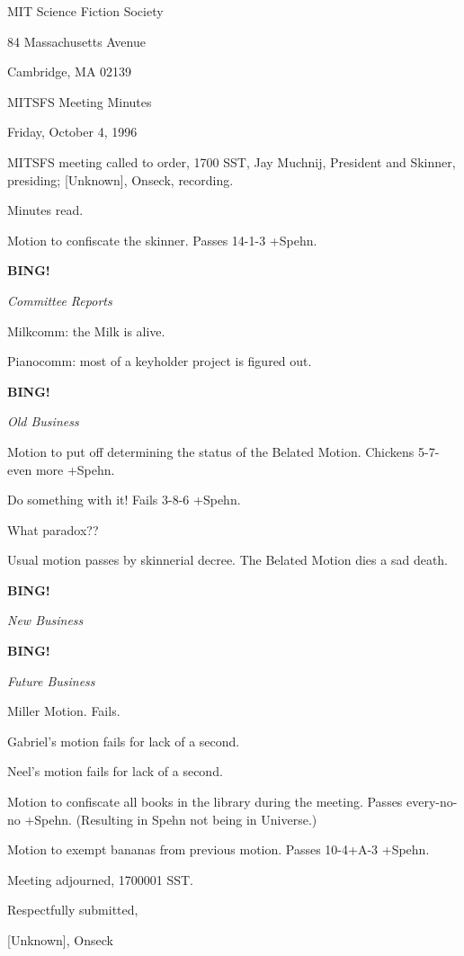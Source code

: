 \documentclass[12pt]{article}
\newcommand{\bing}{{\bf BING!} }
\newcommand{\goto}[1]{\bing \vskip 12pt \centerline{{\em{#1}}}}
\begin{document}
\begin{center}

MIT Science Fiction Society 

84 Massachusetts Avenue

Cambridge, MA 02139

\vspace{12pt}

MITSFS Meeting Minutes 

Friday, October 4, 1996

\end{center}
 
\vspace{18pt}

\setlength{\parskip}{6pt}

\noindent
MITSFS meeting called to order, 1700 SST,
Jay Muchnij, President and Skinner, presiding; [Unknown], Onseck, recording.

Minutes read.

Motion to confiscate the skinner. Passes 14-1-3 +Spehn.

\goto{Committee Reports}

Milkcomm: the Milk is alive.

Pianocomm: most of a keyholder project is figured out.

\goto{Old Business}

Motion to put off determining the status of the Belated Motion. Chickens 5-7-even more +Spehn.

Do something with it! Fails 3-8-6 +Spehn.

What paradox??

Usual motion passes by skinnerial decree. The Belated Motion dies a sad death.

\goto{New Business}

\goto{Future Business}

Miller Motion. Fails.

Gabriel's motion fails for lack of a second.

Neel's motion fails for lack of a second.

Motion to confiscate all books in the library during the meeting. Passes every-no-no +Spehn. (Resulting in Spehn not being in Universe.)

Motion to exempt bananas from previous motion. Passes 10-4+A-3 +Spehn.

\vspace{12pt}

\noindent
Meeting adjourned, 1700001 SST.

\vspace{18pt}

\centerline{Respectfully submitted,}
\centerline{[Unknown], Onseck}
\end{document}
